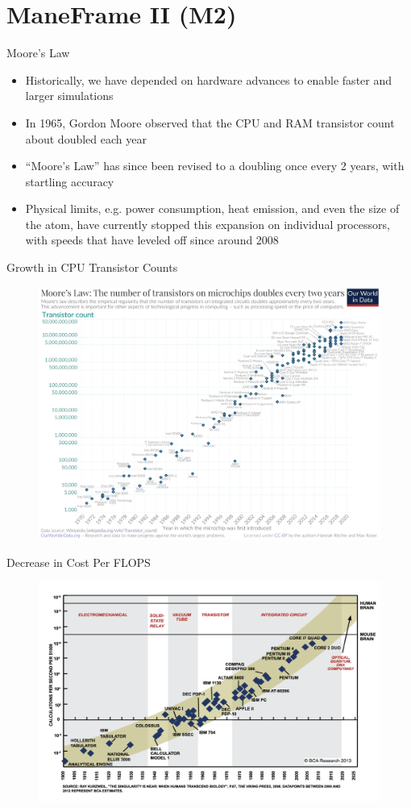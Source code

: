 \section{ManeFrame II (M2)}

\begin{frame}{Moore's Law}
\begin{itemize}
\item Historically, we have depended on hardware advances to enable faster and
      larger simulations
\item In 1965, Gordon Moore observed that the CPU and RAM transistor count
      about doubled each year
\item ``Moore’s Law'' has since been revised to a doubling once every 2 years,
      with startling accuracy
\item Physical limits, e.g. power consumption, heat emission, and even the size
      of the atom, have currently stopped this expansion on individual processors,
      with speeds that have leveled off since around 2008
\end{itemize}
\end{frame}

\begin{frame}{Growth in CPU Transistor Counts}
\begin{figure}
  \centering
  \includegraphics[width=0.65\linewidth]{figures/cpu_transistor_counts.png}
\end{figure}
\end{frame}

\begin{frame}{Decrease in Cost Per FLOPS}
\begin{figure}
  \centering
  \includegraphics[width=0.65\linewidth]{figures/compute_cost.png}
\end{figure}
\end{frame}

